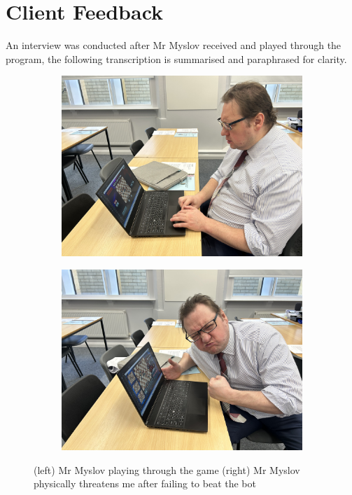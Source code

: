 \documentclass[../main/main.tex]{subfiles}
\begin{document}
\section{Client Feedback}
An interview was conducted after Mr Myslov received and played through the program, the following transcription is summarised and paraphrased for clarity.

\begin{figure}[H]
    \centering

    \begin{subfigure}[b]{0.49\columnwidth}
    \includegraphics[width=\columnwidth]{../evaluation/assets/myslov_playing.jpeg}
    \end{subfigure}
    \hfill
    \begin{subfigure}[b]{0.49\columnwidth}
    \includegraphics[width=\columnwidth]{../evaluation/assets/myslov_angry.jpeg}
    \end{subfigure}

\caption{(left) Mr Myslov playing through the game (right) Mr Myslov physically threatens me after failing to beat the bot}
\label{fig:client-interview}
\end{figure}
\end{document}
